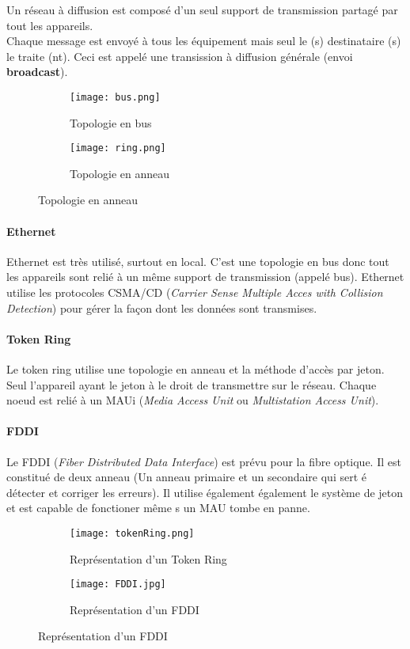  Un réseau à diffusion est composé d'un seul support de transmission partagé par tout les appareils.\\
 Chaque message est envoyé à tous les équipement mais seul le (s) destinataire (s) le traite (nt). Ceci est appelé une transission à diffusion générale (envoi \textbf{broadcast}).\\
 \begin{figure}[h]
	 \begin{subfigure}{.5\textwidth}
		 \centering
		 \texttt{[image: bus.png]}
	 	 \caption{Topologie en bus}
	 \end{subfigure}
	 \begin{subfigure}{.5\textwidth}
		 \centering
		 \texttt{[image: ring.png]}
		 \caption{Topologie en anneau}
	 \end{subfigure}
 \end{figure}
 \paragraph{Ethernet}\leavevmode

 \smallskip

 Ethernet est très utilisé, surtout en local. C'est une topologie en bus donc tout les appareils sont relié à un même support de transmission (appelé bus). Ethernet utilise les protocoles CSMA/CD (\textit{Carrier Sense Multiple Acces with Collision Detection}) pour gérer la façon dont les données sont transmises.

 \paragraph{Token Ring}\leavevmode

 \smallskip

 Le token ring utilise une topologie en anneau et la méthode d'accès par jeton. Seul l'appareil ayant le jeton à le droit de transmettre sur le réseau. Chaque noeud est relié à un MAUi (\textit{Media Access Unit} ou \textit{Multistation Access Unit})\@.

 \paragraph{FDDI}\leavevmode

 \smallskip

 Le FDDI (\textit{Fiber Distributed Data Interface}) est prévu pour la fibre optique. Il est constitué de deux anneau (Un anneau primaire et un secondaire qui sert é détecter et corriger les erreurs). Il utilise également également le système de jeton et est capable de fonctioner même s un MAU tombe en panne.
 \begin{figure}[h]
	 \begin{subfigure}{.5\textwidth}
		 \centering
		 \texttt{[image: tokenRing.png]}
		 \caption{Représentation d'un Token Ring}
	 \end{subfigure}
	 \begin{subfigure}{.5\textwidth}
		 \centering
		 \texttt{[image: FDDI.jpg]}
		 \caption{Représentation d'un FDDI}
	 \end{subfigure}
 \end{figure}

